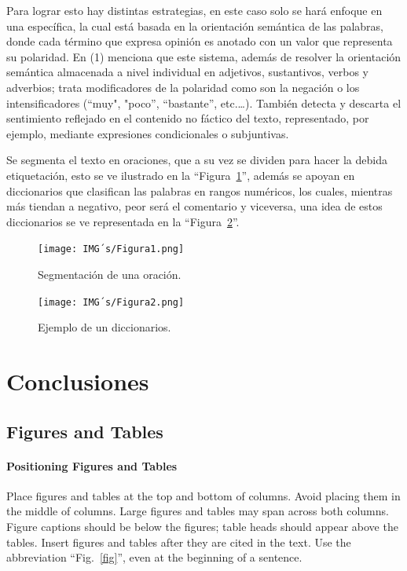 \documentclass[conference]{IEEEtran}
\begin{document}
\begin{itemize}
  Para lograr esto hay distintas estrategias, en este caso solo se hará enfoque en una específica, la cual está basada en la orientación semántica de las palabras, donde cada término que expresa opinión es anotado con un valor que representa su polaridad. En (1) menciona que este sistema, además de resolver la orientación semántica almacenada a nivel individual en adjetivos, sustantivos, verbos y adverbios; trata modificadores de la polaridad como son la negación o los intensificadores (“muy", "poco”, “bastante”, etc.…). También detecta y descarta el sentimiento reflejado en el contenido no fáctico del texto, representado, por ejemplo, mediante expresiones condicionales o subjuntivas. 
  
  Se segmenta el texto en oraciones, que a su vez se dividen para hacer la debida etiquetación, esto se ve ilustrado en la ``Figura~\ref{fig1}'', además se apoyan en diccionarios que clasifican las palabras en rangos numéricos, los cuales, mientras más tiendan a negativo, peor será el comentario y viceversa, una idea de estos diccionarios se ve representada en la ``Figura~\ref{fig2}''. 

\end{itemize}
\begin{figure}[htbp]
  \caption{Segmentación de una oración.}
  \centerline{\texttt{[image: IMG´s/Figura1.png]}}
  \label{fig1}
\end{figure}
\newpage
\begin{figure}[htbp]
  \caption{Ejemplo de un diccionarios.}
  \centerline{\texttt{[image: IMG´s/Figura2.png]}}
  \label{fig2}
\end{figure}


\section{Conclusiones}

\subsection{Figures and Tables}
\paragraph{Positioning Figures and Tables} Place figures and tables at the top and 
bottom of columns. Avoid placing them in the middle of columns. Large 
figures and tables may span across both columns. Figure captions should be 
below the figures; table heads should appear above the tables. Insert 
figures and tables after they are cited in the text. Use the abbreviation 
``Fig.~\ref{fig}'', even at the beginning of a sentence.
\end{document}
